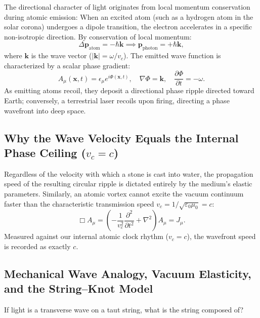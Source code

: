 The directional character of light originates from local momentum conservation during atomic emission:
When an excited atom (such as a hydrogen atom in the solar corona) undergoes a dipole transition, the electron accelerates in a specific non-isotropic direction. By conservation of local momentum:
\begin{equation}
    \Delta \mathbf{p}_{\mathrm{atom}} = -\hbar \mathbf{k} \implies \mathbf{p}_{\mathrm{photon}} = +\hbar \mathbf{k},
    \label{eq:momentum_korunumu}
\end{equation}
where $\mathbf{k}$ is the wave vector ($|\mathbf{k}| = \omega / v_c$). The emitted wave function is characterized by a scalar phase gradient:
\begin{equation}
    A_\mu(\mathbf{x}, t) = \epsilon_\mu e^{i \Phi(\mathbf{x}, t)}, \quad \nabla \Phi = \mathbf{k}, \quad \frac{\partial \Phi}{\partial t} = -\omega.
    \label{eq:yonlu_faz_denklemi}
\end{equation}
As emitting atoms recoil, they deposit a directional phase ripple directed toward Earth; conversely, a terrestrial laser recoils upon firing, directing a phase wavefront into deep space.

\subsection{Why the Wave Velocity Equals the Internal Phase Ceiling (\texorpdfstring{$v_c = c$}{vc})}
Regardless of the velocity with which a stone is cast into water, the propagation speed of the resulting circular ripple is dictated entirely by the medium's elastic parameters. Similarly, an atomic vortex cannot excite the vacuum continuum faster than the characteristic transmission speed $v_c = 1/\sqrt{\varepsilon_0\mu_0} = c$:
\begin{equation}
    \Box A_\mu = \left( -\frac{1}{v_c^2} \frac{\partial^2}{\partial t^2} + \nabla^2 \right) A_\mu = J_\mu.
    \label{eq:dalga_operatoru_vc}
\end{equation}
Measured against our internal atomic clock rhythm ($v_c = c$), the wavefront speed is recorded as exactly $c$.

\subsection{Mechanical Wave Analogy, Vacuum Elasticity, and the String--Knot Model}
\label{sec:tel_ve_dugum_ontolojisi}

If light is a transverse wave on a taut string, what is the string composed of?

